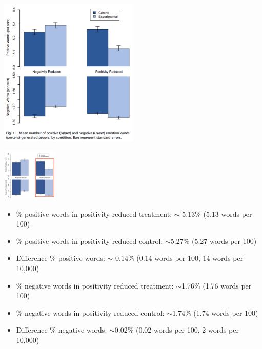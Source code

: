 \documentclass[aspectratio=169]{beamer}
\begin{document}
\begin{frame}

\begin{center}
\includegraphics[width=0.5\textwidth]{figures/kramer_experimental_2014_fig1}
\end{center}

\end{frame}
\begin{frame}

\begin{center}
\includegraphics[width=0.2\textwidth]{figures/kramer_experimental_2014_fig1_positivity_reduced}
\end{center}

\begin{itemize}
\item \% positive words in positivity reduced treatment: $\sim$ 5.13\% (5.13 words per 100)
\item \% positive words in positivity reduced control: $\sim$5.27\% (5.27 words per 100)
\item Difference \% positive words: $\sim$-0.14\% (0.14 words per 100, 14 words per 10,000) 
\end{itemize}

\pause

\begin{itemize}
\item \% negative words in positivity reduced treatment: $\sim$1.76\% (1.76 words per 100)
\item \% negative words in positivity reduced control: $\sim$1.74\% (1.74 words per 100)
\item Difference \% negative words: $\sim$0.02\% (0.02 words per 100, 2 words per 10,000) 
\end{itemize}


\end{frame}
\end{document}
